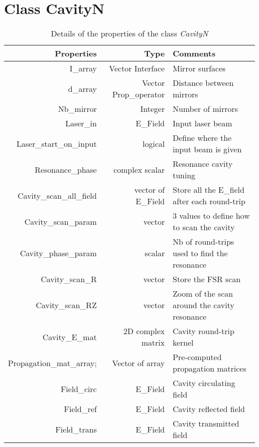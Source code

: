 \section{Class CavityN}

\begin{table}
  \centering
  \caption{\label{App3:CavityN} Details of the properties of the class \textsl{CavityN} }
\begin{tabular}{|r r l|}
\hline
{\Large\strut} Properties & Type &  Comments \\
\hline
{\Large\strut} I\_array &  Vector Interface & Mirror surfaces \\
{\Large\strut} d\_array &  Vector Prop\_operator & Distance between mirrors \\
{\Large\strut} Nb\_mirror &  Integer & Number of mirrors \\
{\Large\strut} Laser\_in &  E\_Field & Input laser beam \\
{\Large\strut} Laser\_start\_on\_input &  logical  & Define where the input beam is given \\
{\Large\strut} Resonance\_phase &  complex scalar &  Resonance cavity tuning \\
{\Large\strut} Cavity\_scan\_all\_field & vector of E\_Field  &  Store all the E\_field after each round-trip \\
{\Large\strut} Cavity\_scan\_param &  vector &  3 values to define how to scan the cavity \\
{\Large\strut} Cavity\_phase\_param &  scalar & Nb of round-trips used to find the resonance \\
{\Large\strut} Cavity\_scan\_R &  vector  & Store the FSR scan  \\
{\Large\strut} Cavity\_scan\_RZ &  vector &  Zoom of the scan around the cavity resonance \\
{\Large\strut} Cavity\_E\_mat &  2D complex matrix &  Cavity round-trip kernel \\
{\Large\strut} Propagation\_mat\_array; & Vector of array & Pre-computed propagation matrices \\
{\Large\strut} Field\_circ &  E\_Field &  Cavity circulating field \\
{\Large\strut} Field\_ref &  E\_Field & Cavity reflected field  \\
{\Large\strut} Field\_trans &  E\_Field & Cavity transmitted field  \\
\hline
\end{tabular}
\end{table}

